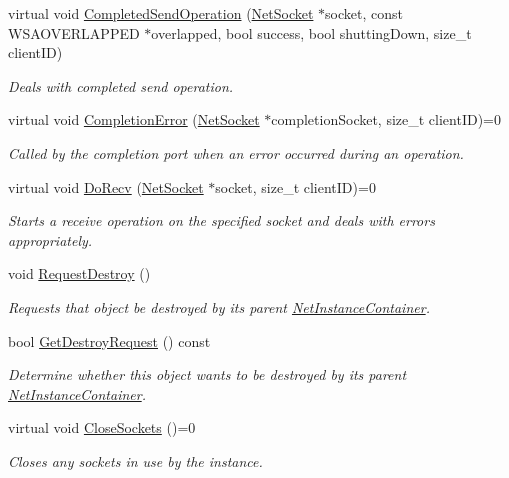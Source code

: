 \begin{DoxyCompactItemize}
virtual void \hyperlink{class_net_instance_a260aef8bfd339567619b78bc2ffc1d80}{CompletedSendOperation} (\hyperlink{class_net_socket}{NetSocket} $\ast$socket, const WSAOVERLAPPED $\ast$overlapped, bool success, bool shuttingDown, size\_\-t clientID)
\begin{DoxyCompactList}\small\item\em Deals with completed send operation. \item\end{DoxyCompactList}\item 
virtual void \hyperlink{class_net_instance_a6f1377ef6caee467d27288cf53619b37}{CompletionError} (\hyperlink{class_net_socket}{NetSocket} $\ast$completionSocket, size\_\-t clientID)=0
\begin{DoxyCompactList}\small\item\em Called by the completion port when an error occurred during an operation. \item\end{DoxyCompactList}\item 
virtual void \hyperlink{class_net_instance_a3c3e7a1dfd8e6c54c25f2a61aa86f183}{DoRecv} (\hyperlink{class_net_socket}{NetSocket} $\ast$socket, size\_\-t clientID)=0
\begin{DoxyCompactList}\small\item\em Starts a receive operation on the specified socket and deals with errors appropriately. \item\end{DoxyCompactList}\item 
void \hyperlink{class_net_instance_a68147db634644849af174937e6706ded}{RequestDestroy} ()
\begin{DoxyCompactList}\small\item\em Requests that object be destroyed by its parent \hyperlink{class_net_instance_container}{NetInstanceContainer}. \item\end{DoxyCompactList}\item 
bool \hyperlink{class_net_instance_ada1fec02cb2835fd600bc3c454b42606}{GetDestroyRequest} () const 
\begin{DoxyCompactList}\small\item\em Determine whether this object wants to be destroyed by its parent \hyperlink{class_net_instance_container}{NetInstanceContainer}. \item\end{DoxyCompactList}\item 
\hypertarget{class_net_instance_ac66260d17fe4b07c2f01aefee8a2b480}{
virtual void \hyperlink{class_net_instance_ac66260d17fe4b07c2f01aefee8a2b480}{CloseSockets} ()=0}
\label{class_net_instance_ac66260d17fe4b07c2f01aefee8a2b480}

\begin{DoxyCompactList}\small\item\em Closes any sockets in use by the instance. \item\end{DoxyCompactList}\end{DoxyCompactItemize}
